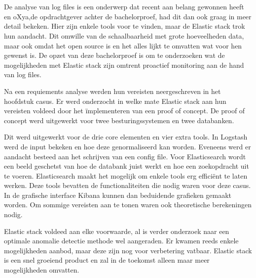 


\chapter*{}

De analyse van log files is een onderwerp dat recent aan belang gewonnen heeft en oXya,de opdrachtgever achter de bachelorproef, had dit dan ook graag in meer detail bekeken. Hier zijn enkele tools voor te vinden, maar de Elastic stack trok hun aandacht. Dit omwille van de schaalbaarheid met grote hoeveelheden data, maar ook omdat het open source is en het alles lijkt te omvatten wat voor hen gewenst is. De opzet van deze bachelorproef is om te onderzoeken wat de mogelijkheden met Elastic stack zijn omtrent proactief monitoring aan de hand van log files. 

Na een requiements analyse werden hun vereisten neergeschreven in het hoofdstuk casus.
Er werd onderzocht in welke mate Elastic stack aan hun vereisten voldeed door het ïmplementeren van een proof of concept. De proof of concept werd uitgewerkt voor twee besturingssystemen en twee databanken.

Dit werd uitgewerkt voor de drie core elementen en vier extra tools. In Logstash werd de input bekeken en hoe deze genormaliseerd kan worden. Eveneens werd er aandacht besteed aan het schrijven van een config file. Voor Elasticsearch wordt een beeld geschetst van hoe de databank juist werkt en hoe een zoekopdracht uit te voeren. Elasticsearch maakt het mogelijk om enkele tools erg efficiënt te laten werken. Deze tools bevatten de functionaliteiten die nodig waren voor deze casus. In de grafische interface Kibana kunnen dan beduidende grafieken gemaakt worden.
Om sommige vereisten aan te tonen waren ook theoretische berekeningen nodig.

Elastic stack voldeed aan elke voorwaarde, al is verder onderzoek naar een optimale anomalie detectie methode wel aangeraden. Er kwamen reeds enkele mogelijkheden aanbod, maar deze zijn nog voor verbetering vatbaar.
Elastic stack is een snel groeiend product en zal in de toekomst alleen maar meer mogelijkheden omvatten.
